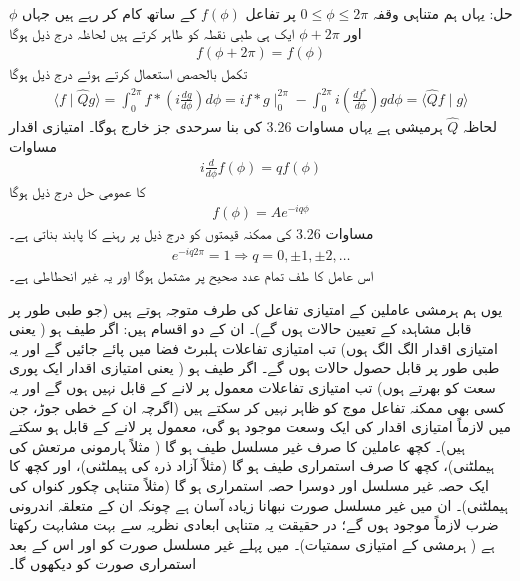 حل: یہاں ہم متناہی وقفہ \(0\leq\phi\leq 2\pi\) پر تفاعل \(f(\phi)\) کے ساتھ کام کر رہے ہیں جہاں \(\phi\) اور \(\phi+2\pi\) ایک ہی طبی نقطہ کو طاہر کرتے ہیں لحاظہ درج ذیل ہوگا 
\begin{align}
	f(\phi + 2\pi) = f(\phi)
\end{align}
تکمل بالحصص استعمال کرتے ہوئے درج ذیل ہوگا 
\begin{align*}
	\langle f\mid\hat{Q}g \rangle = \int_{0}^{2\pi}f{*}(i\frac{dg}{d\phi})d\phi = if{*}g\mid^{2\pi}_{0} - \int_{0}^{2\pi}i(\frac{df^*}{d\phi})gd\phi = \langle \hat{Q}f\mid g \rangle
\end{align*}
لحاظہ \(\hat{Q}\) ہرمیشی ہے یہاں مساوات \num{3.26} کی بنا سرحدی جز خارج ہوگا۔ امتیازی اقدار مساوات  
\begin{align}
	i\frac{d}{d\phi}f(\phi) = qf(\phi)
\end{align}
کا عمومی حل درج ذیل ہوگا
\begin{align}
	f(\phi) = Ae^{-iq\phi}
\end{align}
مساوات \num{3.26}  کی ممکنہ قیمتوں کو درج ذیل پر رہنے کا پابند بناتی ہے۔
\begin{align}
	e^{-iq2\pi} = 1 \Rightarrow q = 0, \pm1, \pm2, \dots
\end{align}
اس عامل کا طف تمام عدد صحیح پر مشتمل ہوگا اور یہ غیر انحطاطی ہے۔

یوں ہم  ہرمشی عاملین کے امتیازی تفاعل کی طرف متوجہ ہوتے ہیں (جو    طبی طور پر  قابل مشاہدہ  کے تعیین حالات ہوں گے)۔  ان کے دو اقسام ہیں:   اگر  طیف  ہو ( یعنی امتیازی اقدار الگ الگ ہوں)   تب امتیازی تفاعلات ہلبرٹ  فضا  میں پائے جائیں گے   اور یہ طبی طور پر قابل حصول حالات  ہوں گے۔  اگر طیف  ہو  (  یعنی امتیازی اقدار ایک  پوری سعت  کو بھرتے ہوں)  تب امتیازی تفاعلات معمول پر لانے کے قابل نہیں ہوں گے   اور یہ کسی بھی ممکنہ تفاعل موج کو ظاہر نہیں کر سکتے ہیں (اگرچہ   ان کے  خطی جوڑ،  جن میں  لازماً  امتیازی اقدار کی ایک وسعت موجود ہو گی،  معمول پر لانے کے قابل ہو سکتے ہیں)۔  کچھ  عاملین کا صرف غیر مسلسل طیف ہو گا (  مثلاً   ہارمونی مرتعش کی ہیملٹنی)،   کچھ  کا صرف استمراری  طیف  ہو گا (مثلاً  آزاد ذرہ کی ہیملٹنی)،   اور کچھ  کا  ایک  حصہ غیر مسلسل اور دوسرا  حصہ استمراری ہو گا (مثلاً متناہی  چکور کنواں کی  ہیملٹنی)۔  ان میں   غیر مسلسل صورت نبھانا زیادہ آسان ہے چونکہ ان کے متعلقہ اندرونی ضرب لازماً موجود ہوں گے؛   در حقیقت یہ متناہی ابعادی نظریہ سے بہت مشابہت رکھتا ہے (  ہرمشی  کے امتیازی سمتیات)۔  میں پہلے غیر مسلسل صورت کو  اور اس کے بعد  استمراری  صورت کو دیکھوں گا۔  

